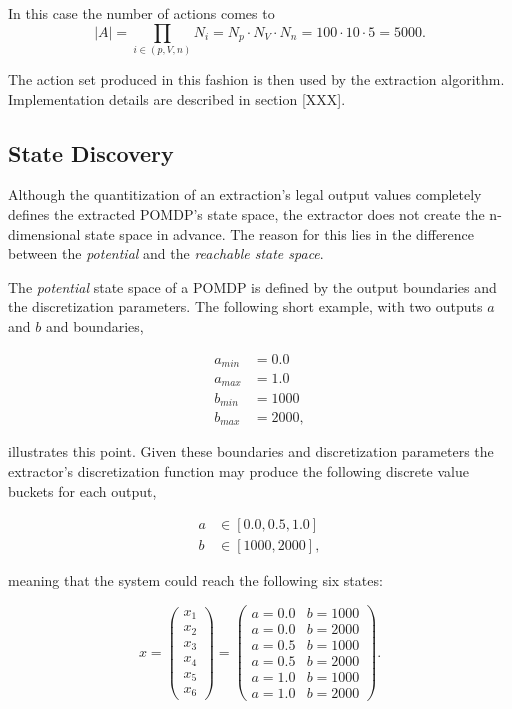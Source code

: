 In this case the number of actions comes to 
\[
|A| = \prod_{i \in (p,V,n)} N_i = N_p \cdot N_V \cdot N_n = 100 \cdot 10 \cdot 5 = 5000.
\]

The action set produced in this fashion is then used by the extraction algorithm. Implementation details are described in section [XXX].

\subsection{State Discovery}
\label{subsec:statediscovery}

Although the quantitization of an extraction's legal output values completely defines the extracted POMDP's state space, the extractor does not create the n-dimensional state space in advance. The reason for this lies in the difference between the \textit{potential} and the \textit{reachable state space}.

The \textit{potential} state space of a POMDP is defined by the output boundaries and the discretization parameters. The following short example, with two outputs $a$ and $b$ and boundaries, 

\begin{align}
a_{min} &= 0.0 \nonumber\\
a_{max} &= 1.0 \nonumber\\
b_{min} &= 1000 \nonumber\\
b_{max} &= 2000 \nonumber,
\end{align}

illustrates this point. Given these boundaries and discretization parameters the extractor's discretization function may produce the following discrete value buckets for each output,

\begin{align}
a &\in [0.0,0.5,1.0] \nonumber \\
b &\in [1000,2000], \nonumber
\end{align}

meaning that the system could reach the following six states:

\[
x = 
\begin{pmatrix}
x_1 \\
x_2 \\
x_3 \\
x_4 \\
x_5 \\
x_6
\end{pmatrix}
=
\begin{pmatrix}
a = 0.0 & b = 1000 \\
a = 0.0 & b = 2000 \\
a = 0.5 & b = 1000 \\
a = 0.5 & b = 2000 \\
a = 1.0 & b = 1000 \\
a = 1.0 & b = 2000
\end{pmatrix}.
\]

